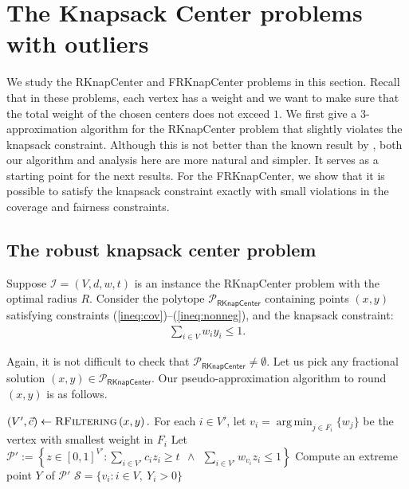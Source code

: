 \documentclass[a4paper,11pt]{article}
\DeclareMathOperator*{\argmin}{arg\,min}
\renewcommand{\S}{\mathcal{S}}
\newcommand{\I}{\mathcal{I}}
\renewcommand{\P}{\mathcal{P}}
\begin{document}
\section{The Knapsack Center problems with outliers}
We study the \textsf{RKnapCenter} and \textsf{FRKnapCenter} problems in this section. Recall that in these problems, each vertex has a weight and we want to make sure that the total weight of the chosen centers does not exceed $1$. We first give a $3$-approximation algorithm for the \textsf{RKnapCenter} problem that slightly violates the knapsack constraint. Although this is not better than the known result by \cite{jianli_kc}, both our algorithm and analysis here are more natural and simpler. It serves as a starting point for the next results. For the \textsf{FRKnapCenter}, we show that it is possible to satisfy the knapsack constraint exactly with small violations in the coverage and fairness constraints.


\subsection{The robust knapsack center problem}
\label{sec:rknapcenter}
Suppose $\I = (V, d, w,  t)$ is an instance the \textsf{RKnapCenter} problem with the optimal radius $R$. Consider the polytope $\P_\textsf{RKnapCenter}$  containing points $(x, y)$ satisfying constraints (\ref{ineq:cov})--(\ref{ineq:nonneg}), and the knapsack constraint: 
\begin{align}
	\sum_{i \in V} w_iy_i \leq 1. \label{ineq:knap} 
\end{align} 

Again, it is not difficult to check that $\P_\textsf{RKnapCenter} \neq \emptyset$. Let us pick any fractional solution $(x,y) \in \P_\textsf{RKnapCenter}$. Our pseudo-approximation algorithm to round $(x,y)$ is as follows.


\begin{algorithm}[h]
\caption{$\textsc{RKnapCenterRound}\left(x,y \right)$}
\begin{algorithmic}[1]
\STATE $(V',\vec{c}) \gets \textsc{RFiltering}\left(x,y \right).$
\STATE For each $i \in V'$, let $v_i = \argmin_{j \in F_i}\{w_j\}$ be the vertex with smallest weight in $F_i$
\STATE Let $\P' := \left\{z \in [0,1]^{V'}: \sum_{i\in V'}c_i z_i \geq t ~~\wedge ~~ \sum_{i \in V'} w_{v_i} z_i \leq 1 \right\}$
\STATE Compute an extreme point $Y$ of $\P'$
\RETURN $\S = \{v_i: i \in V,~ Y_i > 0\}$
\end{algorithmic} 
\label{algo:rknapcenter}
\end{algorithm}
\end{document}
